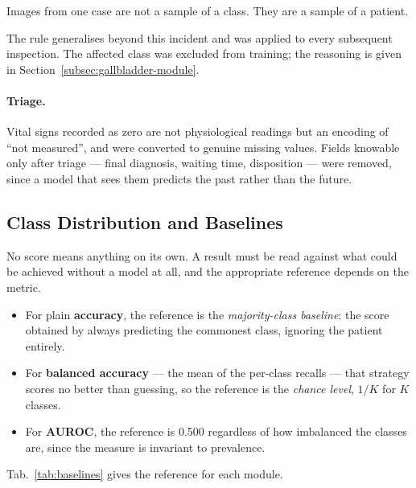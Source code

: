\begin{keystatement}
Images from one case are not a sample of a class. They are a sample of a patient.
\end{keystatement}

The rule generalises beyond this incident and was applied to every subsequent inspection.
The affected class was excluded from training; the reasoning is given in
Section~\ref{subsec:gallbladder-module}.

\paragraph{Triage.} Vital signs recorded as zero are not physiological readings but an
encoding of ``not measured'', and were converted to genuine missing values. Fields knowable
only after triage --- final diagnosis, waiting time, disposition --- were removed, since a
model that sees them predicts the past rather than the future.

\subsection{Class Distribution and Baselines}
\label{subsec:data-distribution}

No score means anything on its own. A result must be read against what could be achieved
without a model at all, and the appropriate reference depends on the metric.

\begin{itemize}[label=$\bullet$]
  \setlength\itemsep{0.2em}
  \item For plain \textbf{accuracy}, the reference is the \textit{majority-class baseline}:
    the score obtained by always predicting the commonest class, ignoring the patient
    entirely.
  \item For \textbf{balanced accuracy} --- the mean of the per-class recalls --- that
    strategy scores no better than guessing, so the reference is the \textit{chance level},
    \(1/K\) for \(K\) classes.
  \item For \textbf{AUROC}, the reference is 0.500 regardless of how imbalanced the classes
    are, since the measure is invariant to prevalence.
\end{itemize}

Tab.~\ref{tab:baselines} gives the reference for each module.


